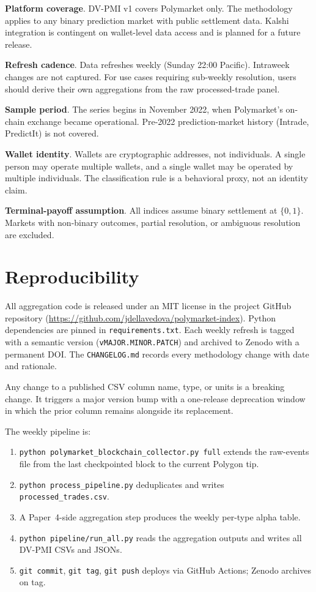 \documentclass[11pt,letterpaper]{article}
\begin{document}
\textbf{Platform coverage}. DV-PMI v1 covers Polymarket only. The methodology applies to any binary prediction market with public settlement data. Kalshi integration is contingent on wallet-level data access and is planned for a future release.

\textbf{Refresh cadence}. Data refreshes weekly (Sunday 22:00 Pacific). Intraweek changes are not captured. For use cases requiring sub-weekly resolution, users should derive their own aggregations from the raw processed-trade panel.

\textbf{Sample period}. The series begins in November 2022, when Polymarket's on-chain exchange became operational. Pre-2022 prediction-market history (Intrade, PredictIt) is not covered.

\textbf{Wallet identity}. Wallets are cryptographic addresses, not individuals. A single person may operate multiple wallets, and a single wallet may be operated by multiple individuals. The classification rule is a behavioral proxy, not an identity claim.

\textbf{Terminal-payoff assumption}. All indices assume binary settlement at $\{0, 1\}$. Markets with non-binary outcomes, partial resolution, or ambiguous resolution are excluded.

\section{Reproducibility}
\label{sec:reproducibility}

All aggregation code is released under an MIT license in the project GitHub repository (\url{https://github.com/jdellavedova/polymarket-index}). Python dependencies are pinned in \texttt{requirements.txt}. Each weekly refresh is tagged with a semantic version (\texttt{vMAJOR.MINOR.PATCH}) and archived to Zenodo with a permanent DOI. The \texttt{CHANGELOG.md} records every methodology change with date and rationale.

Any change to a published CSV column name, type, or units is a breaking change. It triggers a major version bump with a one-release deprecation window in which the prior column remains alongside its replacement.

The weekly pipeline is:
\begin{enumerate}
  \item \texttt{python polymarket\_blockchain\_collector.py full} extends the raw-events file from the last checkpointed block to the current Polygon tip.
  \item \texttt{python process\_pipeline.py} deduplicates and writes \texttt{processed\_trades.csv}.
  \item A Paper~4-side aggregation step produces the weekly per-type alpha table.
  \item \texttt{python pipeline/run\_all.py} reads the aggregation outputs and writes all DV-PMI CSVs and JSONs.
  \item \texttt{git commit}, \texttt{git tag}, \texttt{git push} deploys via GitHub Actions; Zenodo archives on tag.
\end{enumerate}
\end{document}

